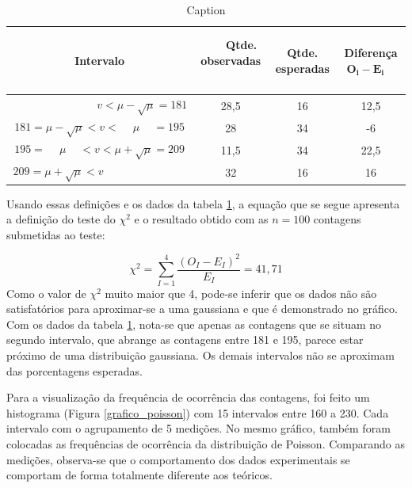 \documentclass{article}
\begin{document}
\begin{table}[hb!]
    \centering
    \begin{tabular}{|c|c|c|c|}
    \hline
    \rowcolor{cinzaclaro}
\textbf{Intervalo} & ~ ~ \textbf{Qtde. observadas} ~ ~   & \textbf{Qtde. esperadas}  & ~ ~ \textbf{Diferença $\mathbf{O _i - E _i}$} ~ ~  \\ \hline
$\qquad \qquad \qquad \quad \ \ \ v < \mu - \sqrt{\mu} = 181 $     & 28,5         & 16    & 12,5         \\ \hline
$181 =\mu - \sqrt{\mu} < v < \ \quad \mu \ \quad = 195$     & 28         & 34     & -6         \\ \hline
$195 =  \ \quad \mu \quad \  < v < \mu + \sqrt{\mu} =209$     & 11,5         & 34     & 22,5         \\ \hline
$209 = \mu + \sqrt{\mu} < v \ \ \quad \qquad \qquad \qquad $      & 32          & 16     & 16         \\ \hline
    \end{tabular}
    \caption{Caption}
    \label{tabelachi2}
\end{table}

Usando essas definições e os dados da tabela \ref{tabelachi2}, a equação que se segue apresenta a definição do teste do $\chi ^2$ e o resultado obtido com as $n= 100$ contagens submetidas ao teste:

\begin{equation}
    \chi ^2 = \sum _{I=1} ^{4} \frac{(O _I - E_I)^2}{E _I} = 41,71
\end{equation}Como o valor de $\chi ^2$  muito maior que 4, pode-se inferir que os dados não são satisfatórios para aproximar-se a uma gaussiana e que é demonstrado no gráfico. Com os dados da tabela \ref{tabelachi2}, nota-se que apenas as contagens que se situam no segundo intervalo, que abrange as contagens entre 181 e 195, parece estar próximo de uma distribuição gaussiana. Os demais intervalos não se aproximam das porcentagens esperadas.

Para a visualização da frequência de ocorrência das contagens, foi feito um histograma (Figura \ref{grafico_poisson}) com 15 intervalos entre 160 a 230. Cada intervalo com o agrupamento de 5 medições. No mesmo gráfico, também foram colocadas as frequências de ocorrência da distribuição de Poisson. Comparando as medições, observa-se que o comportamento dos dados experimentais se comportam de forma totalmente diferente aos teóricos.
\end{document}
